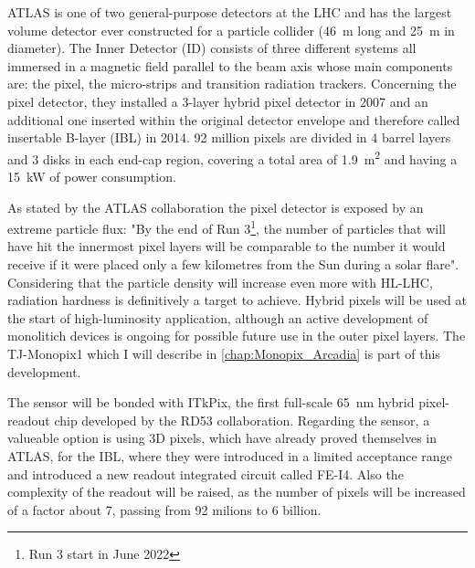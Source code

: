         ATLAS is one of two general-purpose detectors at the LHC and has the largest volume detector ever constructed for a particle
        collider (\SI{46}{m} long and \SI{25}{m} in diameter).  
        The Inner Detector (ID) consists of three different systems all immersed in a magnetic field parallel to the beam axis whose main components are: the pixel, the micro-strips and transition radiation trackers. 
        Concerning the pixel detector, they installed a 3-layer hybrid pixel detector in 2007 and an additional one inserted within the original detector envelope and therefore called insertable B-layer (IBL) in 2014.
        92 million pixels are divided in 4 barrel layers and 3 disks in each end-cap region, covering a total area of \SI{1.9}{m\squared} and having a \SI{15}{kW} of power consumption. 

        As stated by the ATLAS collaboration the pixel detector is exposed by an extreme particle flux: "By the end of Run 3\footnote{Run 3 start in June 2022}, the number of particles that will have hit the innermost pixel layers will be comparable to the number it would receive if it were placed only a few kilometres from the Sun during a solar flare". Considering that the particle density will increase even more with HL-LHC, radiation hardness is definitively a target to achieve. 
        Hybrid pixels will be used at the start of high-luminosity application, although an active development of monolitich devices is ongoing for possible future use in the outer pixel layers. The TJ-Monopix1 which I will describe in \ref{chap:Monopix_Arcadia} is part of this development. 
       
        The sensor will be bonded with ITkPix, the first full-scale \SI{65}{nm} hybrid pixel-readout chip developed by the RD53 collaboration.
        Regarding the sensor, a valueable option is using 3D pixels, which have already proved themselves in ATLAS, for the IBL, where they were introduced in a limited acceptance range and introduced a new readout integrated circuit called FE-I4.  
        Also the complexity of the readout will be raised, as the number of pixels will be increased of a factor about 7, passing from 92 milions to 6 billion.
    
